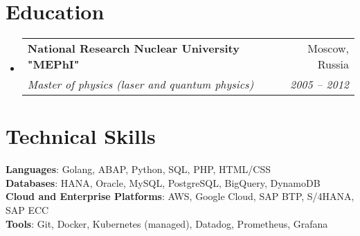 \documentclass[letterpaper,11pt]{article}
\makeatletter
\newcommand{\resumeSubheading}[4]{
  \vspace{-2pt}\item
    \begin{tabular*}{0.97\textwidth}[t]{l@{\extracolsep{\fill}}r}
      \textbf{#1} & #2 \\
      \textit{\small#3} & \textit{\small #4} \\
    \end{tabular*}\vspace{-7pt}
}
\newcommand{\resumeSubHeadingListStart}{\begin{itemize}[leftmargin=0.15in, label={}]}
\newcommand{\resumeSubHeadingListEnd}{\end{itemize}}
\makeatother
\begin{document}
\section{Education}
  \resumeSubHeadingListStart
    \resumeSubheading
      {National Research Nuclear University "MEPhI"}{Moscow, Russia}
      {Master of physics (laser and quantum physics)}{2005 -- 2012}
  \resumeSubHeadingListEnd

\section{Technical Skills}
 \begin{itemize}[leftmargin=0.15in, label={}]
    \small{\item{
     \textbf{Languages}{: Golang, ABAP, Python, SQL, PHP, HTML/CSS } \\
     \textbf{Databases}{: HANA, Oracle, MySQL, PostgreSQL, BigQuery, DynamoDB } \\
     \textbf{Cloud and Enterprise Platforms}{: AWS, Google Cloud, SAP BTP, S/4HANA, SAP ECC} \\
     \textbf{Tools}{: Git, Docker, Kubernetes (managed), Datadog, Prometheus, Grafana} \\
    }}
 \end{itemize}

\end{document}
